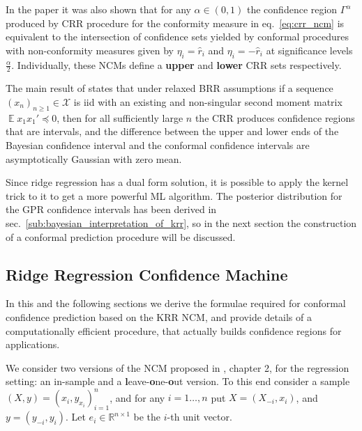 \documentclass[a4paper,14pt]{extarticle}
\newcommand{\ex}{\mathop{\mathbb{E}}\nolimits}
\newcommand{\Xcal}{\mathcal{X}}
\newcommand{\Real}{\mathbb{R}}
\begin{document}
In the paper it was also shown that for any $\alpha\in(0,1)$ the confidence
region $\Gamma^\alpha$ produced by CRR procedure for the conformity measure in
eq.~\ref{eq:crr_ncm} is equivalent to the intersection of confidence sets yielded
by conformal procedures with non-conformity measures given by $\eta_i = \hat{r}_i$
and $\eta_i = -\hat{r}_i$ at significance levels $\frac{\alpha}{2}$. Individually,
these NCMs define a \textbf{upper} and \textbf{lower} CRR sets respectively.

The main result of \cite{burnaevV14} states that under relaxed BRR assumptions if
a sequence $(x_n)_{n\geq1}\in\Xcal$ is iid with an existing and non-singular second
moment matrix $\ex x_1x_1' \preceq 0$, then for all sufficiently large $n$ the CRR
produces confidence regions that are intervals, and the difference between the upper
and lower ends of the Bayesian confidence interval and the conformal confidence
intervals are asymptotically Gaussian with zero mean.

Since ridge regression has a dual form solution, it is possible to apply the kernel
trick to it to get a more powerful ML algorithm. The posterior distribution for the
GPR confidence intervals has been derived in sec.~\ref{sub:bayesian_interpretation_of_krr},
so in the next section the construction of a conformal prediction procedure will be
discussed.


\subsection{Ridge Regression Confidence Machine} %
\label{sub:ridge_regression_confidence_machine}

In this and the following sections we derive the formulae required for conformal
confidence prediction based on the KRR NCM, and provide details of a computationally
efficient procedure, that actually builds confidence regions for applications.

We consider two versions of the NCM proposed in \cite{vovk2005}, chapter 2,
for the regression setting: an in-sample and a \textbf{l}eave-\textbf{o}ne-\textbf{o}ut
version. To this end consider a sample $(X, y) = (x_i, y_{x_i})_{i=1}^n$, and for
any $i=1\ldots, n$ put $X = (X_{-i}, x_i)$, and $y = (y_{-i}, y_i)$.
Let $e_i\in \Real^{n\times 1}$ be the $i$-th unit vector.
\end{document}
